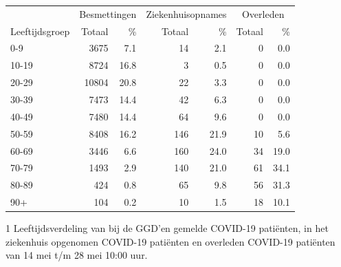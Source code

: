 \documentclass[
  english,
  man,floatsintext]{apa6}
\begin{document}
\begin{table}
\centering\begingroup\fontsize{11}{13}\selectfont

\begin{threeparttable}
\begin{tabular}{lrrrrrr}
\toprule
\multicolumn{1}{c}{ } & \multicolumn{2}{c}{Besmettingen} & \multicolumn{2}{c}{Ziekenhuisopnames} & \multicolumn{2}{c}{Overleden} \\
\cmidrule(l{3pt}r{3pt}){2-3} \cmidrule(l{3pt}r{3pt}){4-5} \cmidrule(l{3pt}r{3pt}){6-7}
Leeftijdsgroep & Totaal & \% & Totaal & \% & Totaal & \%\\
\midrule
0-9 & 3675 & 7.1 & 14 & 2.1 & 0 & 0.0\\
10-19 & 8724 & 16.8 & 3 & 0.5 & 0 & 0.0\\
20-29 & 10804 & 20.8 & 22 & 3.3 & 0 & 0.0\\
30-39 & 7473 & 14.4 & 42 & 6.3 & 0 & 0.0\\
40-49 & 7480 & 14.4 & 64 & 9.6 & 0 & 0.0\\
50-59 & 8408 & 16.2 & 146 & 21.9 & 10 & 5.6\\
60-69 & 3446 & 6.6 & 160 & 24.0 & 34 & 19.0\\
70-79 & 1493 & 2.9 & 140 & 21.0 & 61 & 34.1\\
80-89 & 424 & 0.8 & 65 & 9.8 & 56 & 31.3\\
90+ & 104 & 0.2 & 10 & 1.5 & 18 & 10.1\\
\bottomrule
\end{tabular}
\begin{tablenotes}
\item[1] Leeftijdsverdeling van bij de GGD’en gemelde COVID-19 patiënten, in het ziekenhuis opgenomen COVID-19 patiënten en overleden COVID-19 patiënten van 14 mei t/m 28 mei 10:00 uur.
\end{tablenotes}
\end{threeparttable}
\endgroup{}
\end{table}

\newpage
\end{document}
